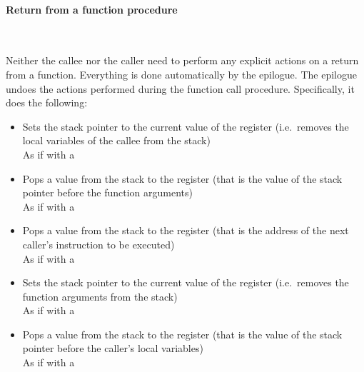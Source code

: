 \hypertarget{functions:return}{
    \paragraph{Return from a function procedure}\
}

Neither the callee nor the caller need to perform any explicit actions
on a return from a function.
Everything is done automatically by the epilogue.
The epilogue undoes the actions performed during the function call procedure.
Specifically, it does the following:

\begin{itemize}
    \item Sets the stack pointer to the current value of the  register
    (i.e.\ removes the local variables of the callee from the stack) \\
    As if with a \hspace{-0.1cm}

    \item Pops a value from the stack to the  register
    (that is the value of the stack pointer before the function arguments) \\
    As if with a \hspace{-0.1cm}

    \item Pops a value from the stack to the  register
    (that is the address of the next caller's instruction to be executed) \\
    As if with a \hspace{-0.1cm}

    \item Sets the stack pointer to the current value of the  register
    (i.e.\ removes the function arguments from the stack) \\
    As if with a \hspace{-0.1cm}

    \item Pops a value from the stack to the  register
    (that is the value of the stack pointer before the caller's local
    variables) \\
    As if with a \hspace{-0.1cm}
\end{itemize}
